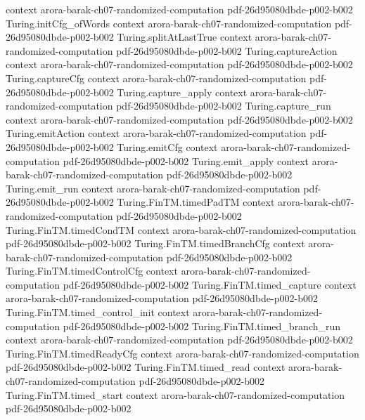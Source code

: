\begin{theorem}
  {context}
  {arora-barak-ch07-randomized-computation}
  {pdf-26d95080dbde-p002-b002}
\proofstep
  {Turing.initCfg_ofWords}
  {context}
  {arora-barak-ch07-randomized-computation}
  {pdf-26d95080dbde-p002-b002}
\proofstep
  {Turing.splitAtLastTrue}
  {context}
  {arora-barak-ch07-randomized-computation}
  {pdf-26d95080dbde-p002-b002}
\proofstep
  {Turing.captureAction}
  {context}
  {arora-barak-ch07-randomized-computation}
  {pdf-26d95080dbde-p002-b002}
\proofstep
  {Turing.captureCfg}
  {context}
  {arora-barak-ch07-randomized-computation}
  {pdf-26d95080dbde-p002-b002}
\proofstep
  {Turing.capture_apply}
  {context}
  {arora-barak-ch07-randomized-computation}
  {pdf-26d95080dbde-p002-b002}
\proofstep
  {Turing.capture_run}
  {context}
  {arora-barak-ch07-randomized-computation}
  {pdf-26d95080dbde-p002-b002}
\proofstep
  {Turing.emitAction}
  {context}
  {arora-barak-ch07-randomized-computation}
  {pdf-26d95080dbde-p002-b002}
\proofstep
  {Turing.emitCfg}
  {context}
  {arora-barak-ch07-randomized-computation}
  {pdf-26d95080dbde-p002-b002}
\proofstep
  {Turing.emit_apply}
  {context}
  {arora-barak-ch07-randomized-computation}
  {pdf-26d95080dbde-p002-b002}
\proofstep
  {Turing.emit_run}
  {context}
  {arora-barak-ch07-randomized-computation}
  {pdf-26d95080dbde-p002-b002}
\proofstep
  {Turing.FinTM.timedPadTM}
  {context}
  {arora-barak-ch07-randomized-computation}
  {pdf-26d95080dbde-p002-b002}
\proofstep
  {Turing.FinTM.timedCondTM}
  {context}
  {arora-barak-ch07-randomized-computation}
  {pdf-26d95080dbde-p002-b002}
\proofstep
  {Turing.FinTM.timedBranchCfg}
  {context}
  {arora-barak-ch07-randomized-computation}
  {pdf-26d95080dbde-p002-b002}
\proofstep
  {Turing.FinTM.timedControlCfg}
  {context}
  {arora-barak-ch07-randomized-computation}
  {pdf-26d95080dbde-p002-b002}
\proofstep
  {Turing.FinTM.timed_capture}
  {context}
  {arora-barak-ch07-randomized-computation}
  {pdf-26d95080dbde-p002-b002}
\proofstep
  {Turing.FinTM.timed_control_init}
  {context}
  {arora-barak-ch07-randomized-computation}
  {pdf-26d95080dbde-p002-b002}
\proofstep
  {Turing.FinTM.timed_branch_run}
  {context}
  {arora-barak-ch07-randomized-computation}
  {pdf-26d95080dbde-p002-b002}
\proofstep
  {Turing.FinTM.timedReadyCfg}
  {context}
  {arora-barak-ch07-randomized-computation}
  {pdf-26d95080dbde-p002-b002}
\proofstep
  {Turing.FinTM.timed_read}
  {context}
  {arora-barak-ch07-randomized-computation}
  {pdf-26d95080dbde-p002-b002}
\proofstep
  {Turing.FinTM.timed_start}
  {context}
  {arora-barak-ch07-randomized-computation}
  {pdf-26d95080dbde-p002-b002}
\proofstep

\end{theorem}
